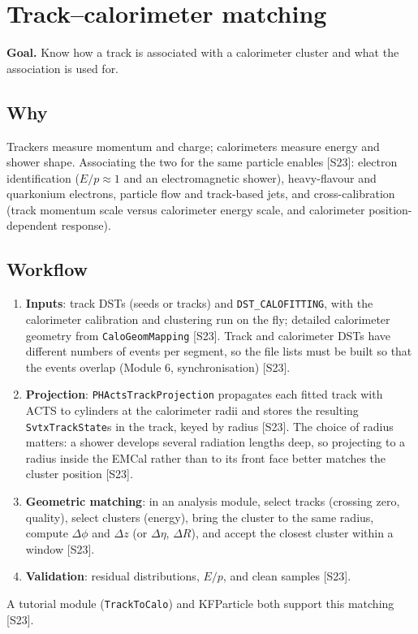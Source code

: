 \documentclass[11pt,letterpaper]{article}
\newcommand{\goal}[1]{\par\noindent\textbf{Goal.} #1\par}
\begin{document}
\section{Track--calorimeter matching}\label{sec:tc}
\goal{Know how a track is associated with a calorimeter cluster and what the association is used for.}

\subsection{Why}
Trackers measure momentum and charge; calorimeters measure energy and shower shape. Associating the two for the same particle enables [S23]:
electron identification ($E/p\approx1$ and an electromagnetic shower), heavy-flavour and quarkonium electrons, particle flow and track-based jets,
and cross-calibration (track momentum scale versus calorimeter energy scale, and calorimeter position-dependent response).

\subsection{Workflow}
\begin{enumerate}
\item \textbf{Inputs}: track DSTs (seeds or tracks) and \texttt{DST\_CALOFITTING}, with the calorimeter calibration and clustering run on the fly; detailed calorimeter geometry from \texttt{CaloGeomMapping} [S23].
Track and calorimeter DSTs have different numbers of events per segment, so the file lists must be built so that the events overlap (Module 6, synchronisation) [S23].
\item \textbf{Projection}: \texttt{PHActsTrackProjection} propagates each fitted track with ACTS to cylinders at the calorimeter radii and stores the resulting \texttt{SvtxTrackState}s in the track, keyed by radius [S23].
The choice of radius matters: a shower develops several radiation lengths deep, so projecting to a radius inside the EMCal rather than to its front face better matches the cluster position [S23].
\item \textbf{Geometric matching}: in an analysis module, select tracks (crossing zero, quality), select clusters (energy), bring the cluster to the same radius, compute $\Delta\phi$ and $\Delta z$ (or $\Delta\eta$, $\Delta R$), and accept the closest cluster within a window [S23].
\item \textbf{Validation}: residual distributions, $E/p$, and clean samples [S23].
\end{enumerate}
A tutorial module (\texttt{TrackToCalo}) and KFParticle both support this matching [S23].
\end{document}
